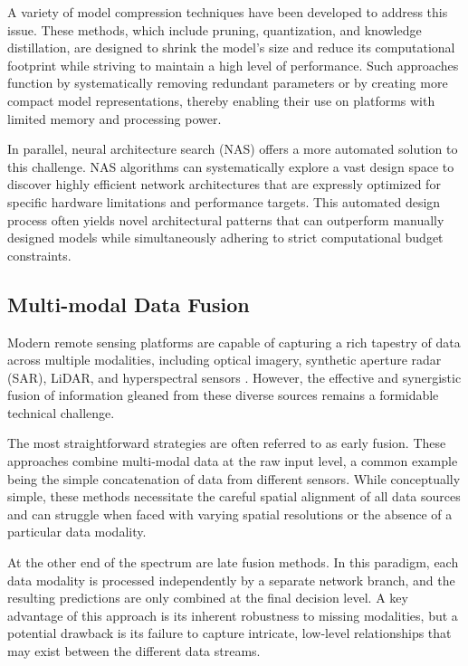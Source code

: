 \documentclass[12pt,a4paper]{article}
\begin{document}
A variety of model compression techniques have been developed to address this issue. These methods, which include pruning, quantization, and knowledge distillation, are designed to shrink the model's size and reduce its computational footprint while striving to maintain a high level of performance. Such approaches function by systematically removing redundant parameters or by creating more compact model representations, thereby enabling their use on platforms with limited memory and processing power.

In parallel, neural architecture search (NAS) offers a more automated solution to this challenge. NAS algorithms can systematically explore a vast design space to discover highly efficient network architectures that are expressly optimized for specific hardware limitations and performance targets. This automated design process often yields novel architectural patterns that can outperform manually designed models while simultaneously adhering to strict computational budget constraints.

\subsection{Multi-modal Data Fusion}
Modern remote sensing platforms are capable of capturing a rich tapestry of data across multiple modalities, including optical imagery, synthetic aperture radar (SAR), LiDAR, and hyperspectral sensors \cite{zhu2017deep}. However, the effective and synergistic fusion of information gleaned from these diverse sources remains a formidable technical challenge.

The most straightforward strategies are often referred to as early fusion. These approaches combine multi-modal data at the raw input level, a common example being the simple concatenation of data from different sensors. While conceptually simple, these methods necessitate the careful spatial alignment of all data sources and can struggle when faced with varying spatial resolutions or the absence of a particular data modality.

At the other end of the spectrum are late fusion methods. In this paradigm, each data modality is processed independently by a separate network branch, and the resulting predictions are only combined at the final decision level. A key advantage of this approach is its inherent robustness to missing modalities, but a potential drawback is its failure to capture intricate, low-level relationships that may exist between the different data streams.
\end{document}
